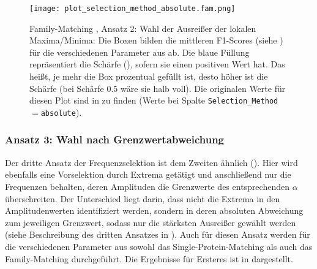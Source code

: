         \begin{figure}[H]
            \texttt{[image: plot\_selection\_method\_absolute.fam.png]}
            \caption[Family-Matching , Ansatz 2:  Wahl der Ausreißer der lokalen Maxima/Minima]{Family-Matching , Ansatz 2:  Wahl der Ausreißer der lokalen Maxima/Minima: Die Boxen bilden die mittleren F1-Scores (siehe ) für die verschiedenen Parameter aus  ab. Die blaue Füllung repräsentiert die Schärfe (), sofern sie einen positiven Wert hat. Das heißt, je mehr die Box prozentual gefüllt ist, desto höher ist die Schärfe (bei Schärfe 0.5 wäre sie halb voll). Die originalen Werte für diesen Plot sind in  zu finden (Werte bei Spalte \texttt{Selection\_Method}$=$\texttt{absolute}).}
            \label{fig:selection_method.absolute.fam}
        \end{figure}

        \subsubsection{Ansatz 3: Wahl nach Grenzwertabweichung} %
        \label{ssub:ansatz_3_results}
        Der dritte Ansatz der Frequenzselektion ist dem Zweiten ähnlich (). Hier wird ebenfalls eine Vorselektion durch Extrema getätigt und anschließend nur die Frequenzen behalten, deren Amplituden die Grenzwerte des entsprechenden $\alpha$ überschreiten. Der Unterschied liegt darin, dass nicht die Extrema in den Amplitudenwerten identifiziert werden, sondern in deren absoluten Abweichung zum jeweiligen Grenzwert, sodass nur die stärksten Ausreißer gewählt werden (siehe Beschreibung des dritten Ansatzes in ). Auch für diesen Ansatz werden für die verschiedenen Parameter aus  sowohl das Single-Protein-Matching als auch das Family-Matching durchgeführt. Die Ergebnisse für Ersteres ist in  dargestellt.
        
